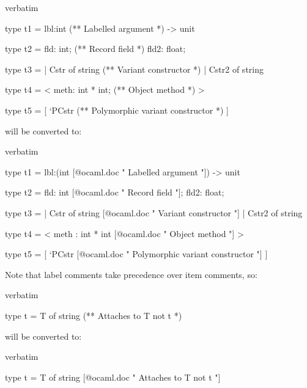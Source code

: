 {\begin{camlexample}{verbatim}
\begin{caml}
\begin{camlinput}
type t1 = lbl:int (** Labelled argument *) -> unit

type t2 = {
  fld: int; (** Record field *)
  fld2: float;
}

type t3 =
  | Cstr of string (** Variant constructor *)
  | Cstr2 of string

type t4 = < meth: int * int; (** Object method *) >

type t5 = [
  `PCstr (** Polymorphic variant constructor *)
]
\end{camlinput}
\end{caml}
\end{camlexample}

will be converted to:

\begin{camlexample}{verbatim}
\begin{caml}
\begin{camlinput}
type t1 = lbl:(int [@ocaml.doc " Labelled argument "]) -> unit

type t2 = {
  fld: int [@ocaml.doc " Record field "];
  fld2: float;
}

type t3 =
  | Cstr of string [@ocaml.doc " Variant constructor "]
  | Cstr2 of string

type t4 = < meth : int * int [@ocaml.doc " Object method "] >

type t5 = [
  `PCstr [@ocaml.doc " Polymorphic variant constructor "]
]
\end{camlinput}
\end{caml}
\end{camlexample}

Note that label comments take precedence over item comments, so:

\begin{camlexample}{verbatim}
\begin{caml}
\begin{camlinput}
type t = T of string
(** Attaches to T not t *)
\end{camlinput}
\end{caml}
\end{camlexample}

will be converted to:

\begin{camlexample}{verbatim}
\begin{caml}
\begin{camlinput}
type t =  T of string [@ocaml.doc " Attaches to T not t "]
\end{camlinput}
\end{caml}
\end{camlexample}

}
